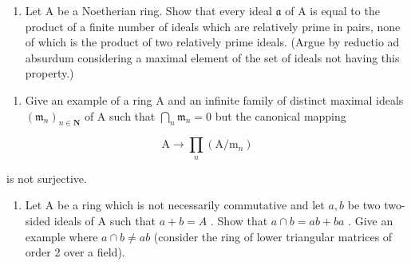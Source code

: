 \begin{enumerate}
\def\labelenumi{(\alph{enumi})}
\setcounter{enumi}{1}
\tightlist
\item
  Let A be a Noetherian ring. Show that every ideal \(\mathfrak{a}\) of A is equal to the product of a finite number of ideals which are relatively prime in pairs, none of which is the product of two relatively prime ideals. (Argue by reductio ad absurdum considering a maximal element of the set of ideals not having this property.)
\end{enumerate}

\begin{enumerate}
\def\labelenumi{\arabic{enumi}.}
\setcounter{enumi}{9}
\tightlist
\item
  Give an example of a ring A and an infinite family of distinct maximal ideals \((\mathfrak{m}_n)_{n\in \mathbf{N}}\) of A such that \(\bigcap_{n}\mathfrak{m}_{n} = 0\) but the canonical mapping
\end{enumerate}

\[
\mathrm{A} \rightarrow \prod_ {n} (\mathrm{A} / \mathrm{m} _ {n})
\]

is not surjective.

\begin{enumerate}
\def\labelenumi{\arabic{enumi}.}
\setcounter{enumi}{10}
\tightlist
\item
  Let A be a ring which is not necessarily commutative and let \(a, b\) be two two-sided ideals of A such that \(a + b = A\) . Show that \(a \cap b = ab + ba\) . Give an example where \(a \cap b \neq ab\) (consider the ring of lower triangular matrices of order 2 over a field).
\end{enumerate}

